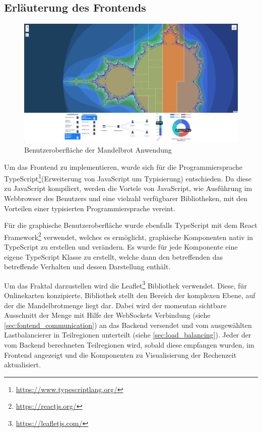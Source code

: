 \begin{figure}
	
\end{figure}


\subsection{Erläuterung des Frontends}

\begin{figure}
	\centering
	\includegraphics[width=0.98\linewidth]{img/Implementierung/UI-Screenshot}
	\caption{Benutzeroberfläche der Mandelbrot Anwendung}
	\label{fig:ui-screenshot}
\end{figure}
Um das Frontend zu implementieren, wurde sich für die Programmiersprache TypeScript\footnote{\url{https://www.typescriptlang.org/}}(Erweiterung von JavaScript um Typisierung) entschieden.
Da diese zu JavaScript kompiliert, werden die Vortele von JavaScript, wie Ausführung im Webbrowser des Benutzers und eine vielzahl verfügbarer Bibliotheken,
mit den Vorteilen einer typisierten Programmiersprache vereint.

Für die graphische Benutzeroberfläche wurde ebenfalls TypeScript mit dem React Framework\footnote{\url{https://reactjs.org/}} verwendet, welches es ermöglicht,
graphische Komponenten nativ in TypeScript zu erstellen und verändern. 
Es wurde für jede Komponente eine eigene TypeScript Klasse zu erstellt, welche dann den betreffenden 
das betreffende Verhalten und dessen Darstellung enthält. 

Um das Fraktal darzustellen wird die Leaflet\footnote{\url{https://leafletjs.com/}} Bibliothek verwendet. 
Diese, für Onlinekarten konzipierte, Bibliothek stellt den Bereich der komplexen Ebene, auf der die Mandelbrotmenge liegt dar.
Dabei wird der momentan sichtbare Ausschnitt der Menge mit Hilfe der WebSockets Verbindung (siehe \autoref{sec:fontend_communication}) an das Backend versendet und vom ausgewählten Lastbalancierer in Teilregionen unterteilt (siehe \autoref{sec:load_balancing}). 
Jeder der vom Backend berechneten Teilregionen wird, sobald diese empfangen wurden, im Frontend angezeigt und die Komponenten
zu Visualisierung der Rechenzeit aktualisiert.

